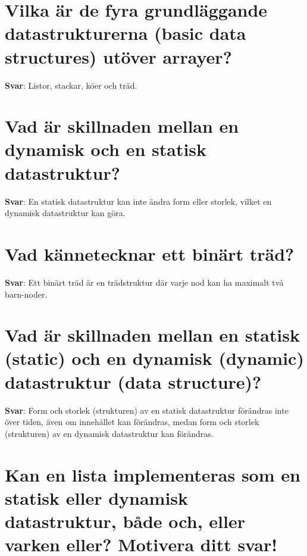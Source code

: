 \documentclass[a4paper,11pt,oneside]{book}
\begin{document}
\begin{sloppypar}
\section{Vilka \"ar de fyra grundl\"aggande datastrukturerna (basic data structures) ut\"over arrayer?}

\label{q:253:sa:sv:True}

\textbf{Svar}: Listor, stackar, k\"oer och tr\"ad.



\section{Vad \"ar skillnaden mellan en dynamisk och en statisk datastruktur?}

\label{q:254:sa:sv:True}

\textbf{Svar}: En statisk datastruktur kan inte \"andra form eller storlek, vilket en dynamisk datastruktur kan g\"ora.



\section{Vad k\"annetecknar ett bin\"art tr\"ad?}

\label{q:255:sa:sv:True}

\textbf{Svar}: Ett bin\"art tr\"ad \"ar en tr\"adstruktur d\"ar varje nod kan ha maximalt tv\r{a} barn-noder.



\section{Vad \"ar skillnaden mellan en statisk (static) och en dynamisk (dynamic) datastruktur (data structure)?}

\label{q:256:sa:sv:True}

\textbf{Svar}: Form och storlek (strukturen) av en statisk datastruktur f\"or\"andras inte \"over tiden, \"aven om inneh\r{a}llet kan f\"or\"andras, medan form och storlek (strukturen) av en dynamisk datastruktur kan f\"or\"andras.



\section{Kan en lista implementeras som en statisk eller dynamisk datastruktur, b\r{a}de och, eller varken eller? Motivera ditt svar!}

\label{q:257:sa:sv:True}


\end{sloppypar}
\end{document}
